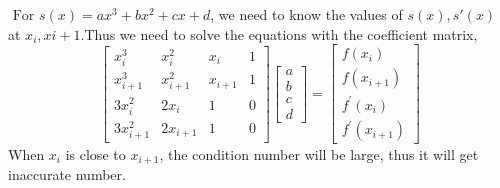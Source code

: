 \documentclass[UTF8]{ctexart}
\begin{document}
\section{}
$\text { For } s(x)=a x^{3}+b x^{2}+c x+d$, we need to know the values of $s(x), s'(x)$ at $x_i, x{i+1}$.Thus we need to solve the equations with the coefficient matrix,
\begin{equation}
    \left[\begin{array}{cccc}
x_{i}^{3} & x_{i}^{2} & x_{i} & 1 \\
x_{i+1}^{3} & x_{i+1}^{2} & x_{i+1} & 1 \\
3 x_{i}^{2} & 2 x_{i} & 1 & 0 \\
3 x_{i+1}^{2} & 2 x_{i+1} & 1 & 0
\end{array}\right]\left[\begin{array}{l}
a \\
b \\
c \\
d
\end{array}\right]=\left[\begin{array}{c}
f\left(x_{i}\right) \\
f\left(x_{i+1}\right) \\
f^{\prime}\left(x_{i}\right) \\
f^{\prime}\left(x_{i+1}\right)
\nonumber
\end{array}\right]
\end{equation}
 When $x_i$ is close to $x_{i+1}$, the condition number will be large, thus it will get inaccurate number.
\end{document}
